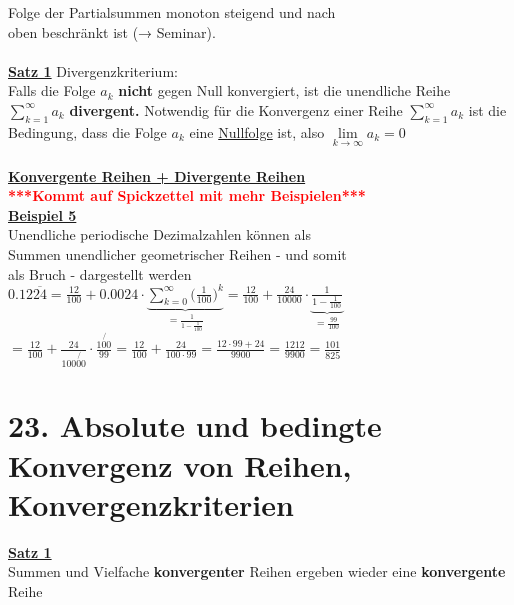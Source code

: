 \documentclass[12pt,a4paper]{article}
\begin{document}
Folge der Partialsummen monoton steigend und nach\\
oben beschränkt ist (→ Seminar). \\
\\
\underline{\textbf{Satz 1}} Divergenzkriterium:\\
Falls die Folge $a_k$ \textbf{nicht} gegen Null konvergiert, ist die
unendliche Reihe\\ 
$\sum\limits_{k=1}^{\infty}a_k$ \textbf{divergent.}
Notwendig für die Konvergenz einer Reihe $\sum\limits_{k=1}^{\infty}a_k$ ist die Bedingung, dass die Folge $a_k$
eine \underline{Nullfolge} ist, also $\lim\limits_{k\rightarrow\infty}a_k=0$
\\
\\
\underline{\textbf{Konvergente Reihen + Divergente Reihen}}\\
\textcolor{red}{\textbf{***Kommt auf Spickzettel mit mehr Beispielen***}}
\\
\underline{\textbf{Beispiel 5}}\\
Unendliche periodische Dezimalzahlen können als \\
Summen unendlicher geometrischer Reihen - und somit \\
als Bruch - dargestellt werden\\
$0.12\overline{24}=\frac{12}{100}+0.0024\cdot\underbrace{\sum\limits_{k=0}^{\infty}\bigl(\frac{1}{100}\bigr)^k}_{=\frac{1}{1-\frac{1}{100}}}=\frac{12}{100}+\frac{24}{10000}\cdot\underbrace{\frac{1}{1-\frac{1}{100}}}_{=\frac{99}{100}}$
\\
$=\frac{12}{100}+\frac{24}{100\not{00}}\cdot\frac{1\not{00}}{99}=\frac{12}{100}+\frac{24}{100\cdot99}=\frac{12\cdot99+24}{9900}=\frac{1212}{9900}=\frac{101}{825}$
\newpage
\section{23. Absolute und bedingte Konvergenz von Reihen, Konvergenzkriterien}
\underline{\textbf{Satz 1}}\\
Summen und Vielfache \textbf{konvergenter} Reihen ergeben wieder eine \textbf{konvergente} Reihe
\end{document}
